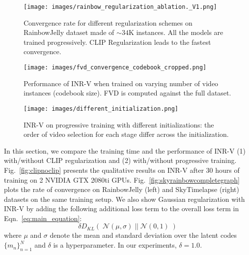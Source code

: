 \documentclass[10pt]{article} \usepackage[accepted]{tmlr}
\begin{document}
\begin{wrapfigure}[52]{r}{0.45\textwidth}
    \centering
    \vspace{2pt}
    \texttt{[image: images/rainbow\_regularization\_ablation.\_V1.png]}
    \caption{\small Convergence rate for different regularization schemes on RainbowJelly dataset made of $\sim34$K instances. All the models are trained progressively. CLIP Regularization leads to the fastest convergence. }
    \label{fig:rainbowgraph}
    


\vspace{7pt}
    \texttt{[image: images/fvd\_convergence\_codebook\_cropped.png]}
    \caption{Performance of INR-V when trained on varying number of video instances (codebook size). FVD is computed against the full dataset.}
    \label{fig:codebooksize-rainbow}


\vspace{7pt}
    \texttt{[image: images/different\_initialization.png]}
    \caption{INR-V on progressive training with different initializations: the order of video selection for each stage differ across the initialization.}
    \label{fig:diff-progtraining}
\end{wrapfigure}
In this section, we compare the training time and the performance of INR-V (1) with/without CLIP regularization and (2) with/without progressive training. Fig.~\ref{fig:clipnoclip} presents the qualitative results on INR-V after $30$ hours of training on 2 NVIDIA GTX 2080ti GPUs. Fig.~\ref{fig:skyrainbowcompletegraph} plots the rate of convergence on RainbowJelly (left) and SkyTimelapse (right) datasets on the same training setup. We also show Gaussian regularization with INR-V by adding the following additional loss term to the overall loss term in Eqn.~\ref{eq:main_equation}: 
\begin{equation}
    \delta D_{KL}(\; \mathcal{N}(\mu, \sigma)\; ||\; \mathcal{N}(0, 1) \;)
\end{equation}
where $\mu$ and $\sigma$ denote the mean and standard deviation over the latent codes $\{m_n\}_{n=1}^{N}$ and $\delta$ is a hyperparameter. In our experiments, $\delta = 1.0$.
\end{document}
